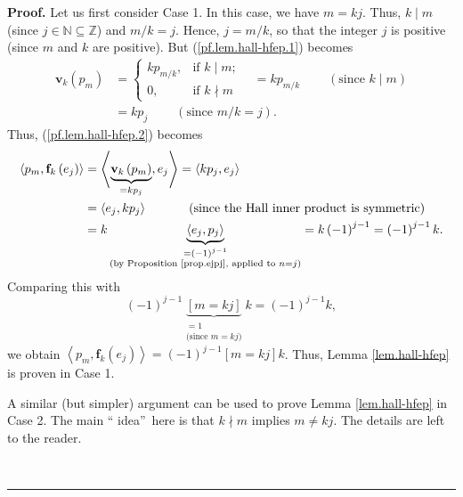 \documentclass[numbers=enddot,12pt,final,onecolumn,notitlepage]{scrartcl}%
\theoremstyle{definition}
\newenvironment{proof}[1][Proof]{\noindent\textbf{#1.} }{\ \rule{0.5em}{0.5em}}
\newenvironment{vershort}{}{}
\begin{document}
\begin{proof}
Let us first consider Case 1. In this case, we have $m=kj$. Thus, $k\mid m$
(since $j\in\mathbb{N}\subseteq\mathbb{Z}$) and $m/k=j$. Hence, $j=m/k$, so
that the integer $j$ is positive (since $m$ and $k$ are positive). But
(\ref{pf.lem.hall-hfep.1}) becomes%
\begin{align*}
\mathbf{v}_{k}\left(  p_{m}\right)   &  =%
\begin{cases}
kp_{m/k}, & \text{if }k\mid m;\\
0, & \text{if }k\nmid m
\end{cases}
\ \ \ \ =kp_{m/k}\ \ \ \ \ \ \ \ \ \ \left(  \text{since }k\mid m\right) \\
&  =kp_{j}\ \ \ \ \ \ \ \ \ \ \left(  \text{since }m/k=j\right)  .
\end{align*}
Thus, (\ref{pf.lem.hall-hfep.2}) becomes%
\begin{align*}
\left\langle p_{m},\mathbf{f}_{k}\left(  e_{j}\right)  \right\rangle  &
=\left\langle \underbrace{\mathbf{v}_{k}\left(  p_{m}\right)  }_{=kp_{j}%
},e_{j}\right\rangle =\left\langle kp_{j},e_{j}\right\rangle \\
&  =\left\langle e_{j},kp_{j}\right\rangle \ \ \ \ \ \ \ \ \ \ \left(
\text{since the Hall inner product is symmetric}\right) \\
&  =k\underbrace{\left\langle e_{j},p_{j}\right\rangle }_{\substack{=\left(
-1\right)  ^{j-1}\\\text{(by Proposition \ref{prop.ejpj}, applied to
}n=j\text{)}}}=k\left(  -1\right)  ^{j-1}=\left(  -1\right)  ^{j-1}k.
\end{align*}
Comparing this with%
\[
\left(  -1\right)  ^{j-1}\underbrace{\left[  m=kj\right]  }%
_{\substack{=1\\\text{(since }m=kj\text{)}}}k=\left(  -1\right)  ^{j-1}k,
\]
we obtain $\left\langle p_{m},\mathbf{f}_{k}\left(  e_{j}\right)
\right\rangle =\left(  -1\right)  ^{j-1}\left[  m=kj\right]  k$. Thus, Lemma
\ref{lem.hall-hfep} is proven in Case 1.

\begin{vershort}
A similar (but simpler) argument can be used to prove Lemma
\ref{lem.hall-hfep} in Case 2. The main \textquotedblleft
idea\textquotedblright\ here is that $k\nmid m$ implies $m\neq kj$. The
details are left to the reader.
\end{vershort}


\end{proof}
\end{document}
